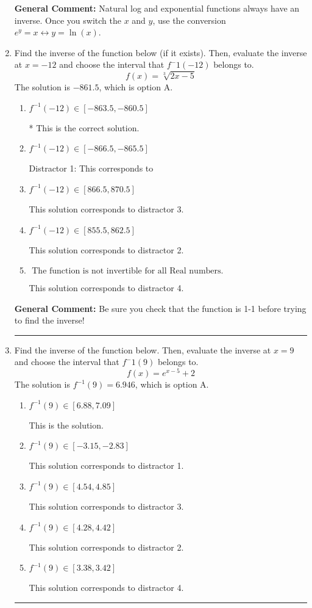 \documentclass{extbook}[14pt]
\newcommand{\litem}[1]{\item #1

\rule{\textwidth}{0.4pt}}
\begin{document}
\begin{enumerate}
{\textbf{General Comment:} Natural log and exponential functions always have an inverse. Once you switch the $x$ and $y$, use the conversion $ e^y = x \leftrightarrow y=\ln(x)$.
}
\litem{
Find the inverse of the function below (if it exists). Then, evaluate the inverse at $x = -12$ and choose the interval that $f^-1(-12)$ belongs to.
\[ f(x) = \sqrt[3]{2 x - 5} \]The solution is \( -861.5 \), which is option A.\begin{enumerate}[label=\Alph*.]
\item \( f^{-1}(-12) \in [-863.5, -860.5] \)

* This is the correct solution.
\item \( f^{-1}(-12) \in [-866.5, -865.5] \)

 Distractor 1: This corresponds to 
\item \( f^{-1}(-12) \in [866.5, 870.5] \)

 This solution corresponds to distractor 3.
\item \( f^{-1}(-12) \in [855.5, 862.5] \)

 This solution corresponds to distractor 2.
\item \( \text{ The function is not invertible for all Real numbers. } \)

 This solution corresponds to distractor 4.
\end{enumerate}

\textbf{General Comment:} Be sure you check that the function is 1-1 before trying to find the inverse!
}
\litem{
Find the inverse of the function below. Then, evaluate the inverse at $x = 9$ and choose the interval that $f^-1(9)$ belongs to.
\[ f(x) = e^{x-5}+2 \]The solution is \( f^{-1}(9) = 6.946 \), which is option A.\begin{enumerate}[label=\Alph*.]
\item \( f^{-1}(9) \in [6.88, 7.09] \)

 This is the solution.
\item \( f^{-1}(9) \in [-3.15, -2.83] \)

 This solution corresponds to distractor 1.
\item \( f^{-1}(9) \in [4.54, 4.85] \)

 This solution corresponds to distractor 3.
\item \( f^{-1}(9) \in [4.28, 4.42] \)

 This solution corresponds to distractor 2.
\item \( f^{-1}(9) \in [3.38, 3.42] \)

 This solution corresponds to distractor 4.
\end{enumerate}

}
\end{enumerate}
\end{document}
